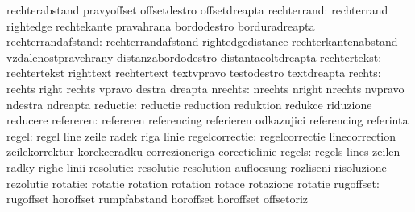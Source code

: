                            rechterabstand            pravyoffset
                           offsetdestro              offsetdreapta
              rechterrand: rechterrand               rightedge
                           rechtekante               pravahrana
                           bordodestro               borduradreapta
       rechterrandafstand: rechterrandafstand        rightedgedistance
                           rechterkantenabstand      vzdalenostpravehrany
                           distanzabordodestro       distantacoltdreapta
             rechtertekst: rechtertekst              righttext
                           rechtertext               textvpravo
                           testodestro               textdreapta %
                   rechts: rechts                    right
                           rechts                    vpravo
                           destra                    dreapta
                  nrechts: nrechts                   nright
                           nrechts                   nvpravo
                           ndestra                   ndreapta
                 reductie: reductie                  reduction
                           reduktion                 redukce
                           riduzione                 reducere
                refereren: refereren                 referencing
                           referieren                odkazujici
                           referencing               referinta %
                    regel: regel                     line
                           zeile                     radek
                           riga                      linie
           regelcorrectie: regelcorrectie            linecorrection
                           zeilekorrektur            korekceradku
                           correzioneriga            corectielinie
                   regels: regels                    lines
                           zeilen                    radky
                           righe                     linii
                resolutie: resolutie                 resolution
                           aufloesung                rozliseni
                           risoluzione               rezolutie
                  rotatie: rotatie                   rotation
                           rotation                  rotace
                           rotazione                 rotatie
                rugoffset: rugoffset                 horoffset
                           rumpfabstand              horoffset
                           horoffset                 offsetoriz %
